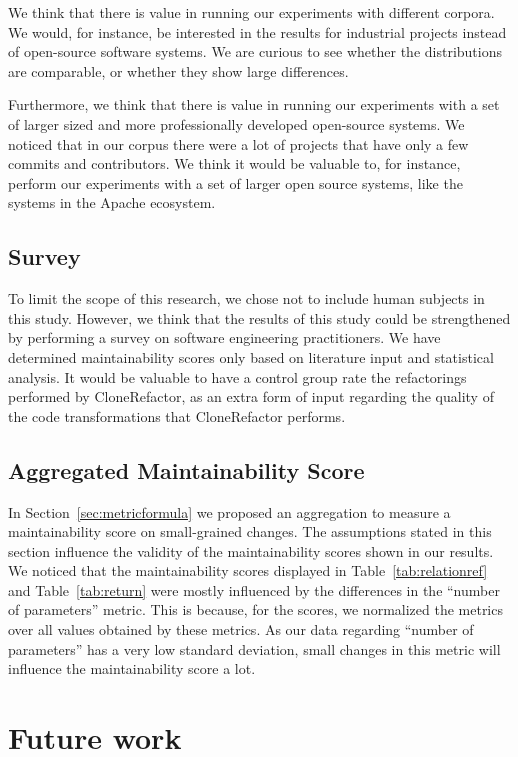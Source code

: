 We think that there is value in running our experiments with different corpora. We would, for instance, be interested in the results for industrial projects instead of open-source software systems. We are curious to see whether the distributions are comparable, or whether they show large differences.

Furthermore, we think that there is value in running our experiments with a set of larger sized and more professionally developed open-source systems. We noticed that in our corpus there were a lot of projects that have only a few commits and contributors. We think it would be valuable to, for instance, perform our experiments with a set of larger open source systems, like the systems in the Apache ecosystem.

\subsection{Survey}
To limit the scope of this research, we chose not to include human subjects in this study. However, we think that the results of this study could be strengthened by performing a survey on software engineering practitioners. We have determined maintainability scores only based on literature input and statistical analysis. It would be valuable to have a control group rate the refactorings performed by CloneRefactor, as an extra form of input regarding the quality of the code transformations that CloneRefactor performs.

\subsection{Aggregated Maintainability Score}
In Section~\ref{sec:metricformula} we proposed an aggregation to measure a maintainability score on small-grained changes. The assumptions stated in this section influence the validity of the maintainability scores shown in our results. We noticed that the maintainability scores displayed in Table~\ref{tab:relationref} and Table~\ref{tab:return} were mostly influenced by the differences in the ``number of parameters'' metric. This is because, for the scores, we normalized the metrics over all values obtained by these metrics. As our data regarding ``number of parameters'' has a very low standard deviation, small changes in this metric will influence the maintainability score a lot.

\section{Future work} \label{sec:future_work}

